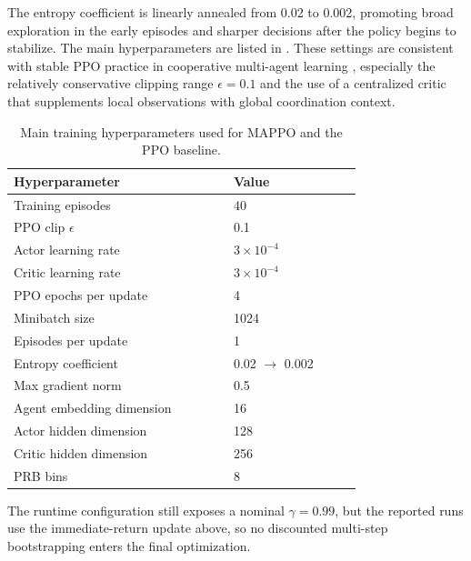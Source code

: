 The entropy coefficient is linearly annealed from 0.02 to 0.002, promoting broad exploration in the early episodes and sharper decisions after the policy begins to stabilize. The main hyperparameters are listed in . These settings are consistent with stable PPO practice in cooperative multi-agent learning \cite{yu2022surprising}, especially the relatively conservative clipping range \(\epsilon = 0.1\) and the use of a centralized critic that supplements local observations with global coordination context.

\begin{table}[htbp]
    \centering
    \begin{tabular}{p{0.48\linewidth}p{0.28\linewidth}}
        \hline
        \textbf{Hyperparameter} & \textbf{Value} \\
        \hline
        Training episodes & 40 \\
        PPO clip \(\epsilon\) & 0.1 \\
        Actor learning rate & \(3 \times 10^{-4}\) \\
        Critic learning rate & \(3 \times 10^{-4}\) \\
        PPO epochs per update & 4 \\
        Minibatch size & 1024 \\
        Episodes per update & 1 \\
        Entropy coefficient & 0.02 \(\rightarrow\) 0.002 \\
        Max gradient norm & 0.5 \\
        Agent embedding dimension & 16 \\
        Actor hidden dimension & 128 \\
        Critic hidden dimension & 256 \\
        PRB bins & 8 \\
        \hline
    \end{tabular}
    \caption{Main training hyperparameters used for MAPPO and the PPO baseline.}
    \label{tab:training-hyperparameters}
\end{table}

The runtime configuration still exposes a nominal \(\gamma = 0.99\), but the reported runs use the immediate-return update above, so no discounted multi-step bootstrapping enters the final optimization.

